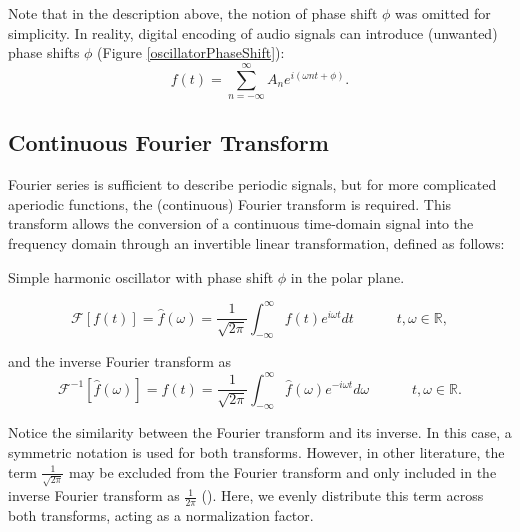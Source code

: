 Note that in the description above, the notion of phase shift $\phi$ was omitted for simplicity. In reality, digital encoding of audio signals can introduce (unwanted) phase shifts $\phi$ (Figure \ref{oscillatorPhaseShift}):
\begin{equation}
f(t) = \sum^\infty_{n=-\infty} A_n e^{i(\omega n t + \phi)}.
\end{equation}



\subsection{Continuous Fourier Transform}
Fourier series is sufficient to describe periodic signals, but for more complicated aperiodic functions, the (continuous) Fourier transform is required. This transform allows the conversion of a continuous time-domain signal into the frequency domain through an invertible linear transformation, defined as follows:

\begin{marginfigure}
\centering

\vspace{0.2cm}
\caption{Simple harmonic oscillator with phase shift $\phi$ in the polar plane.}
\label{oscillatorPhaseShift} 
\end{marginfigure}

\begin{equation}
    \mathcal {F}[f(t)] = \hat{f}(\omega)= \frac{1}{\sqrt{2 \pi}} \int_{-\infty}^{\infty} f(t) e^{i \omega t}dt 
    \; \; \; \; \; \; \; \; \; \; \; 
    t, \omega \in \mathbb{R},
\end{equation}

and the inverse Fourier transform as
\begin{equation}
    \mathcal {F}^{-1}[\hat{f}(\omega)] = f(t) = \frac{1}{\sqrt{2 \pi}} \int_{-\infty}^{\infty} 
    \hat{f}(\omega)e^{-i \omega t}d\omega
    \; \; \; \; \; \; \; \; \; \; \; 
    t, \omega \in \mathbb{R}.
\end{equation}

Notice the similarity between the Fourier transform and its inverse. In this case, a symmetric notation is used for both transforms. However, in other literature, the term $\frac{1}{\sqrt{2 \pi}}$ may be excluded from the Fourier transform and only included in the inverse Fourier transform as $\frac{1}{2 \pi}$ (\cite{baraniuk_82_2020}). Here, we evenly distribute this term across both transforms, acting as a normalization factor.


